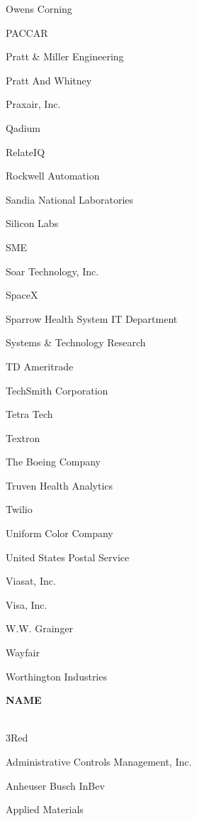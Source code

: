 \documentclass[twoside]{article}
\begin{document}
\begin{center}
\begin{multicols}{5}
\begin{FlushLeft}
\begin{compactitem}
\item Owens Corning
\item PACCAR
\item Pratt \& Miller Engineering
\item Pratt And Whitney
\item Praxair, Inc.
\item Qadium
\item RelateIQ
\item Rockwell Automation
\item Sandia National Laboratories
\item Silicon Labs
\item SME
\item Soar Technology, Inc.
\item SpaceX
\item Sparrow Health System IT Department
\item Systems \& Technology Research
\item TD Ameritrade
\item TechSmith Corporation
\item Tetra Tech
\item Textron
\item The Boeing Company
\item Truven Health Analytics
\item Twilio
\item Uniform Color Company
\item United States Postal Service
\item Viasat, Inc.
\item Visa, Inc.
\item W.W. Grainger
\item Wayfair
\item Worthington Industries
\end{compactitem}
        \end{FlushLeft}
        \vspace{1em}
        {\fontsize{14}{16}\selectfont \bf NAME}\\
        \vspace{-1em}
        ~\hrulefill~
        \vspace{-.9em}
        \begin{FlushLeft}
        \begin{compactitem}
        \item 3Red
\item Administrative Controls Management, Inc.
\item Anheuser Busch InBev
\item Applied Materials

\end{compactitem}
\end{FlushLeft}
\end{multicols}
\end{center}
\end{document}
